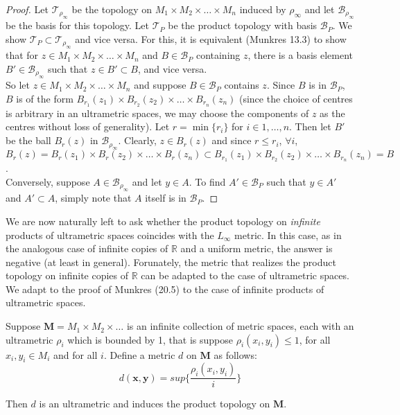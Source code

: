 \begin{proof}
Let $\mathcal{T}_{\rho_\infty}$ be the topology on $M_{1} \times M_{2} \times \ldots \times M_{n}$ induced by $\rho_\infty$ and let $\mathcal{B}_{\rho_\infty}$ be the basis for this topology. Let $\mathcal{T}_{P}$ be the product topology with basis $\mathcal{B}_P$. We show $\mathcal{T}_{P} \subset \mathcal{T}_{\rho_\infty}$ and vice versa. For this, it is equivalent (Munkres 13.3) to show that for $z \in  M_{1} \times M_{2} \times \ldots \times M_{n}$ and $B \in \mathcal{B}_{P}$ containing $z$, there is a basis element $B' \in \mathcal{B}_{\rho_\infty}$ such that $z \in B' \subset B$, and vice versa.\\

So let  $z \in M_{1} \times M_{2} \times \ldots \times M_{n}$ and suppose $B \in \mathcal{B}_{P}$ contains $z$. Since $B$ is in $\mathcal{B}_{P}$, $B$ is of the form $B_{r_1}(z_1) \times B_{r_2}(z_2) \times \ldots \times B_{r_n}(z_n)$ (since the choice of centres is arbitrary in an ultrametric spaces, we may choose the components of $z$ as the centres without loss of generality). Let $r=\min \{r_i\}$ for $i \in 1,\ldots, n$. Then let $B'$ be the ball $B_r(z)$ in $ \mathcal{B}_{\rho_\infty}$. Clearly, $z \in B_r(z)$ and since $r \leq r_i$, $\forall i$, $B_r(z) = B_r(z_1) \times B_r(z_2) \times \ldots \times B_r(z_n) \subset  B_{r_1}(z_1) \times B_{r_2}(z_2) \times \ldots \times B_{r_n}(z_n) =B$.\\

Conversely, suppose $A \in \mathcal{B}_{\rho_\infty}$ and let $y \in A$. To find $A' \in \mathcal{B}_{P}$ such that $y \in A'$ and $A' \subset A$, simply note that $A$ itself is in $\mathcal{B}_{P}$.

\end{proof}

We are now naturally left to ask whether the product topology on \textit{infinite} products of ultrametric spaces coincides with the $L_\infty$ metric. In this case, as in the analogous case of infinite copies of $\mathbb{R}$ and a uniform metric, the answer is negative (at least in general). Forunately, the metric that realizes the product topology on infinite copies of $\mathbb{R}$ can be adapted to the case of ultrametric spaces. We adapt to the proof of Munkres (20.5) to the case of infinite products of ultrametric spaces.

\begin{proposition*}
Suppose $\textbf{M} = M_{1} \times M_{2} \times \ldots$ is an infinite collection of metric spaces, each with an ultrametric $\rho_i$ which is bounded by 1, that is suppose $\rho_i(x_i,y_i) \leq 1$, for all $x_i, y_i \in M_i$ and for all $i$. Define a metric $d$ on $\textbf{M}$ as follows: \[d(\textbf{x},\textbf{y}) = sup\{\frac{\rho_i(x_i,y_i)}{i}\}\]

Then $d$ is an ultrametric and induces the product topology on $\textbf{M}$.
\end{proposition*}

